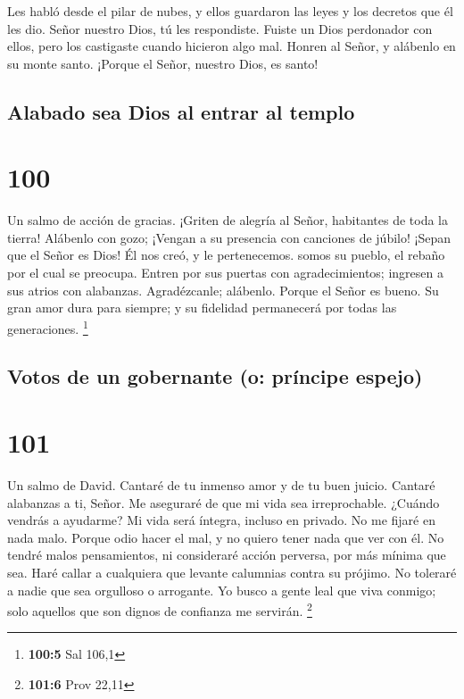  Les habló desde el pilar de nubes, y ellos guardaron las
leyes y los decretos que él les dio.  Señor nuestro Dios, tú
les respondiste. Fuiste un Dios perdonador con ellos, pero los
castigaste cuando hicieron algo mal.  Honren al Señor, y
alábenlo en su monte santo. ¡Porque el Señor, nuestro Dios, es santo!

\hypertarget{alabado-sea-dios-al-entrar-al-templo}{%
\subsection{Alabado sea Dios al entrar al
templo}\label{alabado-sea-dios-al-entrar-al-templo}}

\hypertarget{section-99}{%
\section{100}\label{section-99}}

Un salmo de acción de gracias.  ¡Griten de alegría al Señor,
habitantes de toda la tierra!  Alábenlo con gozo; ¡Vengan a
su presencia con canciones de júbilo!  ¡Sepan que el Señor
es Dios! Él nos creó, y le pertenecemos. somos su pueblo, el rebaño por
el cual se preocupa.  Entren por sus puertas con
agradecimientos; ingresen a sus atrios con alabanzas. Agradézcanle;
alábenlo.  Porque el Señor es bueno. Su gran amor dura para
siempre; y su fidelidad permanecerá por todas las generaciones.
\footnote{\textbf{100:5} Sal 106,1}

\hypertarget{votos-de-un-gobernante-o-pruxedncipe-espejo}{%
\subsection{Votos de un gobernante (o: príncipe
espejo)}\label{votos-de-un-gobernante-o-pruxedncipe-espejo}}

\hypertarget{section-100}{%
\section{101}\label{section-100}}

Un salmo de David.  Cantaré de tu inmenso amor y de tu buen
juicio. Cantaré alabanzas a ti, Señor.  Me aseguraré de que
mi vida sea irreprochable. ¿Cuándo vendrás a ayudarme? Mi vida será
íntegra, incluso en privado.  No me fijaré en nada malo.
Porque odio hacer el mal, y no quiero tener nada que ver con él.
 No tendré malos pensamientos, ni consideraré acción
perversa, por más mínima que sea.  Haré callar a cualquiera
que levante calumnias contra su prójimo. No toleraré a nadie que sea
orgulloso o arrogante.  Yo busco a gente leal que viva
conmigo; solo aquellos que son dignos de confianza me servirán.
\footnote{\textbf{101:6} Prov 22,11}

